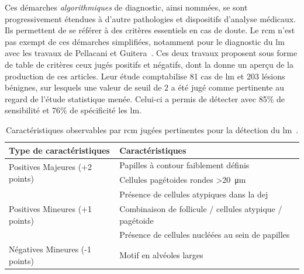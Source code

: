 Ces démarches \textit{algorithmiques} de diagnostic, ainsi nommées, se sont progressivement étendues à d'autre pathologies et dispositifs d'analyse médicaux. Ils permettent de se référer à des critères essentiels en cas de doute. Le \gls{rcm} n'est pas exempt de ces démarches simplifiées, notamment pour le diagnostic du \gls{lm} avec les travaux de Pellacani et Guitera~\cite{Pellacani2007, Guitera2010}. Ces deux travaux proposent sous forme de table de critères ceux jugés positifs et négatifs, dont la  donne un aperçu de la production de ces articles. Leur étude comptabilise 81 cas de \gls{lm} et 203 lésions bénignes, sur lesquels une valeur de seuil de 2 a été jugé comme pertinente au regard de l'étude statistique menée. Celui-ci a permis de détecter avec 85\% de sensibilité et 76\% de spécificité les \gls{lm}.\par

\begin{table}[H]
\centering
    \begin{tabular}{ll}
        \toprule
        Type de caractéristiques                        & Caractéristiques                                              \\\hline
        \multirow{2}{*}{Positives Majeures (+2 points)} & Papilles à contour faiblement définis                         \\\cline{2-2}
                                                        & Cellules pagétoides rondes >\SI{20}{\micro\metre}             \\\hline
        \multirow{3}{*}{Positives Mineures (+1 points)} & Présence de cellules atypiques dans la \gls{dej}              \\\cline{2-2}
                                                        & Combinaison de follicule / cellules atypique / pagétoide      \\\cline{2-2}
                                                        & Présence de cellules nucléées au sein de papilles              \\\hline
        Négatives Mineures (-1 points)                  & Motif en alvéoles larges                                      \\
        \bottomrule
    \end{tabular}
\caption{Caractéristiques observables par \gls{rcm} jugées pertinentes pour la détection du \gls{lm}~\cite{Guitera2010}.}
\label{tab:rcm_algorithm_lentigo}
\end{table}\par
 
